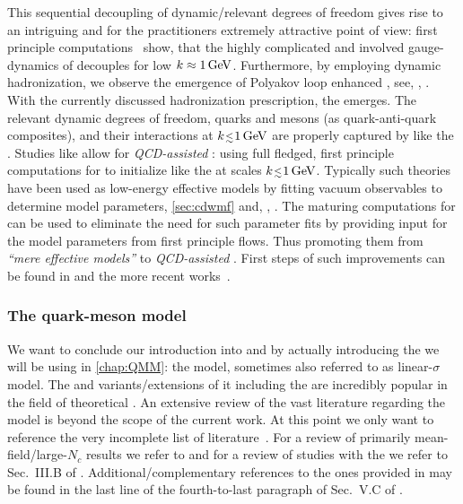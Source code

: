 This sequential decoupling of dynamic/relevant degrees of freedom gives rise to an intriguing and for the \frg{} practitioners extremely attractive point of view: first principle \frg{} \qcd{} computations~\cite{Fu:2019hdw} show, that the highly complicated and involved gauge-dynamics of \qcd{} decouples for low \rgscales{} $k\approx 1\,\mathrm{GeV}$. 
Furthermore, by employing dynamic hadronization, we observe the emergence of Polyakov loop enhanced \loefts{}, see, \eg{}, .
With the currently discussed hadronization prescription, \viz{} the \pqmm{} emerges.
The relevant dynamic degrees of freedom, \viz{} quarks and mesons (as quark-anti-quark composites), and their interactions at $k\smallerlesssim1\,\GeV$ are properly captured by \loefts{} like the \pqmm{}.
Studies like  allow for \textit{QCD-assisted} \loefts{}: using full fledged, first principle \frg{} computations for \qcd{} to initialize \loefts{} like the \pqmm{} at scales $k\smallerlesssim 1\,\GeV$.
Typically such theories have been used as low-energy effective models by fitting vacuum observables to determine model parameters, \cf{} \cref{sec:cdwmf} and, \eg{}, .
The maturing \frg{} computations for \qcd{} can be used to eliminate the need for such parameter fits by providing input for the model parameters from first principle \qcd{} flows.
Thus promoting them from \textit{``mere effective models''} to \textit{QCD-assisted} \loefts{}.
First steps of such improvements can be found in  and the more recent works~\cite{Leonhardt:2019fua,Ihssen:2023xlp}.

\subsubsection{The quark-meson model}\label{subsubsec:qcdQMM}
We want to conclude our introduction into \qcd{} and \loefts{} by actually introducing the \loeft{} we will be using in \cref{chap:QMM}: the  model, sometimes also referred to as linear-$\sigma$ model. 
The \qmm{} and variants/extensions of it \dash{} including the \pqmm{} \dash{} are incredibly popular in the field of theoretical \hep{}.
An extensive review of the vast literature regarding the model is beyond the scope of the current work.
At this point we only want to reference the very incomplete list of \qmm{} \frg{} literature~\cite{Ellwanger:1994wy,Schaefer:2004en,Rennecke:2016tkm,Fu:2018qsk,Alkofer:2018guy,Tripolt:2017zgc,Eser:2018jqo,Divotgey:2019xea,Eser:2019pvd,Grossi:2021ksl,Ihssen:2023xlp}.
For a review of primarily mean-field/large-$N_c$ results we refer to  and for a review of \frg{} studies with the \qmm{} we refer to Sec.~III.B of .
Additional/complementary references to the ones provided in  may be found in the last line of the fourth-to-last paragraph of Sec.~V.C of .\bigskip

